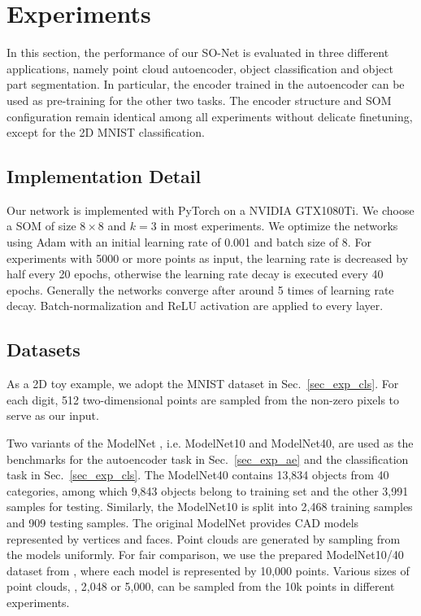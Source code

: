 \documentclass[10pt,twocolumn,letterpaper]{article}
\begin{document}
\section{Experiments} \label{sec_experiments}

In this section, the performance of our SO-Net is evaluated in three different applications, namely point cloud autoencoder, object classification and object part segmentation. In particular, the encoder trained in the autoencoder can be used as pre-training for the other two tasks. The encoder structure and SOM configuration remain identical among all experiments without delicate finetuning, except for the 2D MNIST classification.

\subsection{Implementation Detail}
Our network is implemented with PyTorch on a NVIDIA GTX1080Ti. We choose a SOM of size $8\times 8$ and $k=3$ in most experiments. We optimize the networks using Adam \cite{kingma2014adam} with an initial learning rate of 0.001 and batch size of 8. For experiments with 5000 or more points as input, the learning rate is decreased by half every 20 epochs, otherwise the learning rate decay is executed every 40 epochs. Generally the networks converge after around 5 times of learning rate decay. Batch-normalization and ReLU activation are applied to every layer.

\subsection{Datasets}
As a 2D toy example, we adopt the MNIST dataset \cite{lecun1998gradient} in Sec.~\ref{sec_exp_cls}. For each digit, 512 two-dimensional points are sampled from the non-zero pixels to serve as our input.

Two variants of the ModelNet \cite{wu20153d}, i.e. ModelNet10 and ModelNet40, are used as the benchmarks for the autoencoder task in Sec.~\ref{sec_exp_ae} and the classification task in Sec.~\ref{sec_exp_cls}. The ModelNet40 contains 13,834 objects from 40 categories, among which 9,843 objects belong to training set and the other 3,991 samples for testing. Similarly, the ModelNet10 is split into 2,468 training samples and 909 testing samples. The original ModelNet provides CAD models represented by vertices and faces. Point clouds are generated by sampling from the models uniformly. For fair comparison, we use the prepared ModelNet10/40 dataset from \cite{qi2017pointnet++}, where each model is represented by 10,000 points. Various sizes of point clouds, \eg, 2,048 or 5,000, can be sampled from the 10k points in different experiments.
\end{document}
